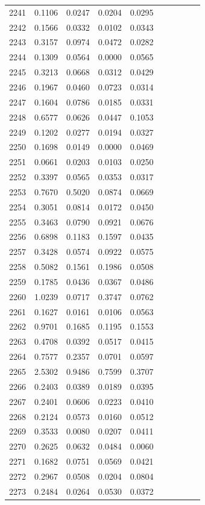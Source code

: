 \begin{table}
\begin{tabular}{cccccccccc}
2241& 0.1106& 0.0247& 0.0204& 0.0295\\ 
2242& 0.1566& 0.0332& 0.0102& 0.0343\\ 
2243& 0.3157& 0.0974& 0.0472& 0.0282\\ 
2244& 0.1309& 0.0564& 0.0000& 0.0565\\ 
2245& 0.3213& 0.0668& 0.0312& 0.0429\\ 
2246& 0.1967& 0.0460& 0.0723& 0.0314\\ 
2247& 0.1604& 0.0786& 0.0185& 0.0331\\ 
2248& 0.6577& 0.0626& 0.0447& 0.1053\\ 
2249& 0.1202& 0.0277& 0.0194& 0.0327\\ 
2250& 0.1698& 0.0149& 0.0000& 0.0469\\ 
2251& 0.0661& 0.0203& 0.0103& 0.0250\\ 
2252& 0.3397& 0.0565& 0.0353& 0.0317\\ 
2253& 0.7670& 0.5020& 0.0874& 0.0669\\ 
2254& 0.3051& 0.0814& 0.0172& 0.0450\\ 
2255& 0.3463& 0.0790& 0.0921& 0.0676\\ 
2256& 0.6898& 0.1183& 0.1597& 0.0435\\ 
2257& 0.3428& 0.0574& 0.0922& 0.0575\\ 
2258& 0.5082& 0.1561& 0.1986& 0.0508\\ 
2259& 0.1785& 0.0436& 0.0367& 0.0486\\ 
2260& 1.0239& 0.0717& 0.3747& 0.0762\\ 
2261& 0.1627& 0.0161& 0.0106& 0.0563\\ 
2262& 0.9701& 0.1685& 0.1195& 0.1553\\ 
2263& 0.4708& 0.0392& 0.0517& 0.0415\\ 
2264& 0.7577& 0.2357& 0.0701& 0.0597\\ 
2265& 2.5302& 0.9486& 0.7599& 0.3707\\ 
2266& 0.2403& 0.0389& 0.0189& 0.0395\\ 
2267& 0.2401& 0.0606& 0.0223& 0.0410\\ 
2268& 0.2124& 0.0573& 0.0160& 0.0512\\ 
2269& 0.3533& 0.0080& 0.0207& 0.0411\\ 
2270& 0.2625& 0.0632& 0.0484& 0.0060\\ 
2271& 0.1682& 0.0751& 0.0569& 0.0421\\ 
2272& 0.2967& 0.0508& 0.0204& 0.0804\\ 
2273& 0.2484& 0.0264& 0.0530& 0.0372\\ 

\end{tabular}
\end{table}
